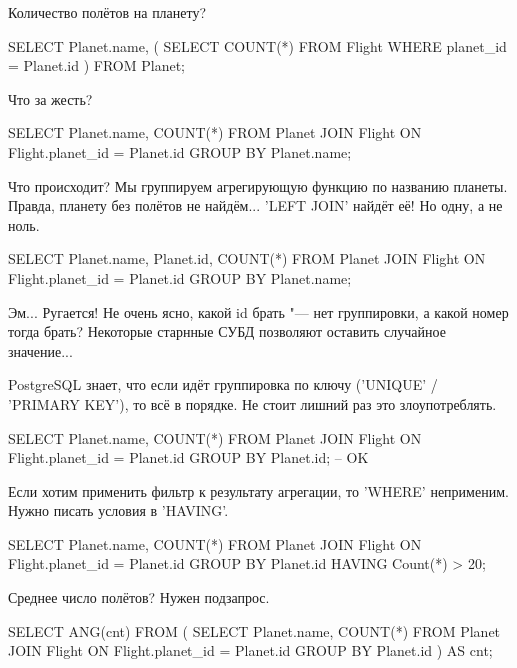 Количество полётов на планету?
\begin{sqlcode}
SELECT Planet.name, (
		SELECT COUNT(*)
			FROM Flight
			WHERE planet_id = Planet.id
	)
	FROM Planet;
\end{sqlcode}
Что за жесть?
\begin{sqlcode}
SELECT Planet.name, COUNT(*)
	FROM Planet
	JOIN Flight ON Flight.planet_id = Planet.id
	GROUP BY Planet.name;
\end{sqlcode}
Что происходит? Мы группируем агрегирующую функцию по названию планеты.
Правда, планету без полётов не найдём... \sql'LEFT JOIN' найдёт её! Но одну, а не ноль.
\begin{sqlcode}
SELECT Planet.name, Planet.id, COUNT(*)
	FROM Planet
	JOIN Flight ON Flight.planet_id = Planet.id
	GROUP BY Planet.name;
\end{sqlcode}
Эм... Ругается! Не очень ясно, какой id брать "--- нет группировки, а какой номер тогда брать?
Некоторые старнные СУБД позволяют оставить случайное значение...

PostgreSQL знает, что если идёт группировка по ключу (\sql'UNIQUE' / \sql'PRIMARY KEY'), то всё в порядке.
Не стоит лишний раз это злоупотреблять.
\begin{sqlcode}
SELECT Planet.name, COUNT(*)
	FROM Planet
	JOIN Flight ON Flight.planet_id = Planet.id
	GROUP BY Planet.id; -- OK
\end{sqlcode}

Если хотим применить фильтр к результату агрегации, то \sql'WHERE' неприменим.
Нужно писать условия в \sql'HAVING'.
\begin{sqlcode}
SELECT Planet.name, COUNT(*)
	FROM Planet
	JOIN Flight ON Flight.planet_id = Planet.id
	GROUP BY Planet.id
	HAVING Count(*) > 20;
\end{sqlcode}
Среднее число полётов?
Нужен подзапрос.
\begin{sqlcode}
SELECT ANG(cnt)
FROM (
	SELECT Planet.name, COUNT(*)
		FROM Planet
		JOIN Flight ON Flight.planet_id = Planet.id
		GROUP BY Planet.id
	) AS cnt;
\end{sqlcode}

